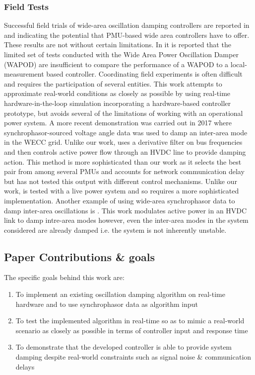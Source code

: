 \documentclass{ieeeaccess}
\begin{document}
\subsubsection{Field Tests}
Successful field trials of wide-area oscillation damping controllers are reported in \cite{WAPODNorway} and \cite{WAPODChina} indicating the potential that PMU-based wide area controllers have to offer. These results are not without certain limitations. In \cite{WAPODNorway} it is reported that the limited set of tests conducted with the Wide Area Power Oscillation Damper (WAPOD) are insufficient to compare the performance of a WAPOD to a local-measurement based controller. Coordinating field experiments is often difficult and requires the participation of several entities. This work attempts to approximate real-world conditions as closely as possible by using real-time hardware-in-the-loop simulation incorporating a hardware-based controller prototype, but avoids several of the limitations of working with an operational power system. A more recent demonstration was carried out in 2017 \cite{Schoenwald_WECC_test} where synchrophasor-sourced voltage angle data was used to damp an inter-area mode in the WECC grid. Unlike our work, \cite{Schoenwald_WECC_test} uses a derivative filter on bus frequencies and then controls active power flow through an HVDC line to provide damping action. This method is more sophisticated than our work as it selects the best pair from among several PMUs and accounts for network communication delay but has not tested this output with different control mechanisms. Unlike our work,  \cite{Schoenwald_WECC_test} is tested with a live power system and so requires a more sophisticated implementation. Another example of using wide-area synchrophasor data to damp inter-area oscillations is \cite{China_2}. This work modulates active power in an HVDC link to damp intre-area modes however, even the inter-area modes in the system considered are already damped i.e. the system is not inherently unstable.


\subsection{Paper Contributions \& goals}

The specific goals behind this work are:
\begin{enumerate}
\item To implement an existing oscillation damping algorithm on real-time hardware and to use synchrophasor data as algorithm input
\item To test the implemented algorithm in real-time so as to mimic a real-world scenario as closely as possible in terms of controller input and response time
\item To demonstrate that the developed controller is able to provide system damping despite real-world constraints such as signal noise \& communication delays
\end{enumerate}
\end{document}

